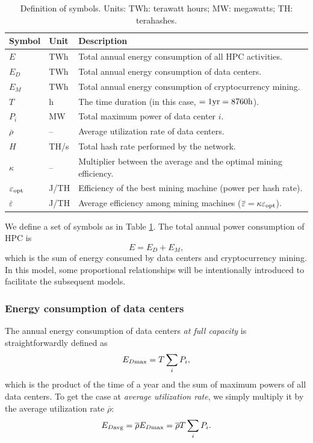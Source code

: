 \documentclass[12pt]{article}
\begin{document}
\begin{table}[!t]
	\centering
	\caption{Definition of symbols. Units: TWh: terawatt hours; MW: megawatts; TH: terahashes.}
	\label{table_symbols_q1}
	\begin{tabular}{lll}
		\hline
		\textbf{Symbol} & \textbf{Unit} & \textbf{Description} \\
		\hline
		$E$ & TWh & Total annual energy consumption of all HPC activities. \\
		$E_D$ & TWh & Total annual energy consumption of data centers. \\
		$E_M$ & TWh & Total annual energy consumption of cryptocurrency mining. \\
		$T$ & h & The time duration (in this case, $\rm = 1yr = 8760h$). \\
		$P_i$ & MW & Total maximum power of data center $i$. \\
		$\overline{\rho}$ & -- & Average utilization rate of data centers. \\
		$H$ & TH/s & Total hash rate performed by the network. \\
		$\kappa$ & -- & Multiplier between the average and the optimal mining efficiency. \\
		$\varepsilon_{\rm opt}$ & J/TH & Efficiency of the best mining machine (power per hash rate). \\
		$\overline{\varepsilon}$ & J/TH & Average efficiency among mining machines ($\overline{\varepsilon} = \kappa \varepsilon_{\rm opt}$). \\
		\hline
	\end{tabular}
\end{table}

We define a set of symbols as in Table \ref{table_symbols_q1}. The total annual power consumption of HPC is
\begin{equation}
	E = E_D + E_M,
\end{equation}
which is the sum of energy consumed by data centers and cryptocurrency mining. In this model, some proportional relationships will be intentionally introduced to facilitate the subsequent models.

\subsubsection{Energy consumption of data centers}

The annual energy consumption of data centers \textit{at full capacity} is straightforwardly defined as
\begin{equation}
	E_{D \rm max} = T \sum_i P_i,
\end{equation}
which is the product of the time of a year and the sum of maximum powers of all data centers. To get the case at \textit{average utilization rate}, we simply multiply it by the average utilization rate $\overline{\rho}$:
\begin{equation}
	E_{D \rm avg} = \overline{\rho} E_{D \rm max} = \overline{\rho} T \sum_i P_i.
\end{equation}
\end{document}
